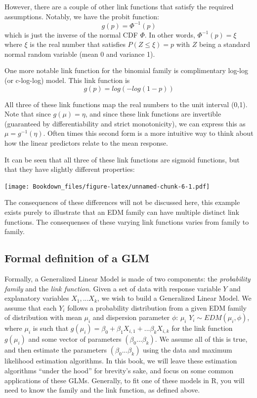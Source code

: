 \documentclass[
]{book}
\begin{document}
However, there are a couple of other link functions that satisfy the required assumptions. Notably, we have the probit function:
\[
g(p)=\Phi^{-1}(p)
\]
which is just the inverse of the normal CDF \(\Phi\). In other words, \(\Phi^{-1}(p) = \xi\) where \(\xi\) is the real number that satisfies \(P(Z\leq\xi)=p\) with \(Z\) being a standard normal random variable (mean 0 and variance 1).

One more notable link function for the binomial family is complimentary log-log (or c-log-log) model. This link function is
\[
g(p) = log(-log(1-p))
\]

All three of these link functions map the real numbers to the unit interval (0,1). Note that since \(g(\mu)=\eta\), and since these link functions are invertible (guaranteed by differentiability and strict monotonicity), we can express this as \(\mu = g^{-1}(\eta)\). Often times this second form is a more intuitive way to think about how the linear predictors relate to the mean response.

It can be seen that all three of these link functions are sigmoid functions, but that they have slightly different properties:

\texttt{[image: Bookdown\_files/figure-latex/unnamed-chunk-6-1.pdf]}

The consequences of these differences will not be discussed here, this example exists purely to illustrate that an EDM family can have multiple distinct link functions. The consequenses of these varying link functions varies from family to family.

\hypertarget{formal-definition-of-a-glm}{%
\subsection{Formal definition of a GLM}\label{formal-definition-of-a-glm}}

Formally, a Generalized Linear Model is made of two components: the \emph{probability family} and the \emph{link function}. Given a set of data with response variable \(Y\) and explanatory variables \(X_1, ... X_k\), we wish to build a Generalized Linear Model. We assume that each \(Y_i\) follows a probability distribution from a given EDM family of distribution with mean \(\mu_i\) and dispersion parameter \(\phi\): \(\mu_i\) \(Y_i \sim EDM(\mu_i,\phi)\), where \(\mu_i\) is such that \(g(\mu_i) = \beta_0 + \beta_1X_{i,1} + ... \beta_kX_{i,k}\) for the link function \(g(\mu_i)\) and some vector of parameters \((\beta_0...\beta_k)\). We assume all of this is true, and then estimate the parameters \((\beta_0...\beta_k)\) using the data and maximum likelihood estimation algorithms. In this book, we will leave these estimation algorithms ``under the hood'' for brevity's sake, and focus on some common applications of these GLMs. Generally, to fit one of these models in R, you will need to know the family and the link function, as defined above.
\end{document}
